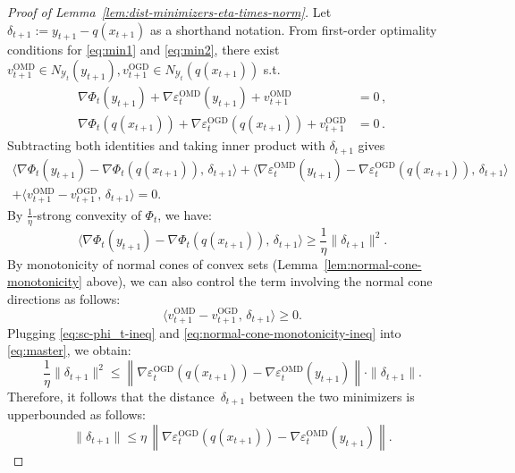 \documentclass[10pt,a4paper]{amsart}
\def\Y{{\mathcal Y}}
\begin{document}
\begin{proof}[Proof of Lemma~\ref{lem:dist-minimizers-eta-times-norm}]
Let $\delta_{t+1}:=y_{t+1}-q(x_{t+1})$ as a shorthand notation.  
From first-order optimality conditions for \eqref{eq:min1} and \eqref{eq:min2},
there exist $v_{t+1}^{\mathrm{OMD}} \in N_{\Y_t}(y_{t+1}), v_{t+1}^{\mathrm{OGD}} \in N_{\Y_t}(q(x_{t+1}))$ s.t. 
\begin{align*}
\nabla \Phi_t(y_{t+1})+\nabla \varepsilon_t^{\mathrm{OMD}}(y_{t+1})+v_{t+1}^{\mathrm{OMD}} &= 0\,,\\
\nabla \Phi_t(q(x_{t+1}))+\nabla \varepsilon_t^{\mathrm{OGD}}(q(x_{t+1}))+v_{t+1}^{\mathrm{OGD}} &= 0\,.
\end{align*}
Subtracting both identities and taking inner product with $\delta_{t+1}$ gives
\begin{multline}
\big\langle \nabla\Phi_t(y_{t+1})-\nabla\Phi_t(q(x_{t+1})),\,\delta_{t+1}\big\rangle
+ \big\langle \nabla\varepsilon_t^{\mathrm{OMD}}(y_{t+1})
- \nabla\varepsilon_t^{\mathrm{OGD}}(q(x_{t+1})),\,\delta_{t+1}\big\rangle \\
+ \big\langle v_{t+1}^{\mathrm{OMD}}-v_{t+1}^{\mathrm{OGD}}, \,\delta_{t+1} \big\rangle
=0.
\label{eq:master}
\end{multline}
By $\frac{1}{\eta}$-strong convexity of $\Phi_t$, we have: 
\begin{equation}
\label{eq:sc-phi_t-ineq}
\big\langle \nabla\Phi_t(y_{t+1})-\nabla\Phi_t(q(x_{t+1})), \,\delta_{t+1}\big\rangle
\ge \frac1\eta \|\delta_{t+1}\|^2.
\end{equation}
By monotonicity of normal cones of convex sets (Lemma~\ref{lem:normal-cone-monotonicity} above),
we can also control the term involving the normal cone directions as follows: 
\begin{equation}
\label{eq:normal-cone-monotonicity-ineq}
\big\langle v_{t+1}^{\mathrm{OMD}}-v_{t+1}^{\mathrm{OGD}}, \,\delta_{t+1} \big\rangle \ge 0.
\end{equation}
Plugging \eqref{eq:sc-phi_t-ineq} and \eqref{eq:normal-cone-monotonicity-ineq} into \eqref{eq:master}, we obtain: 
\begin{equation*}
\frac1\eta\|\delta_{t+1}\|^2
\le 
\left\| \nabla\varepsilon_t^{\mathrm{OGD}}(q(x_{t+1})) - \nabla\varepsilon_t^{\mathrm{OMD}}(y_{t+1}) \right\|
\cdot \|\delta_{t+1}\|.
\end{equation*}
Therefore, it follows that the distance~$\delta_{t+1}$ between the two minimizers is upperbounded as follows: 
\[
\|\delta_{t+1}\|
\le
\eta\,
\left\|
\nabla\varepsilon_t^{\mathrm{OGD}}(q(x_{t+1}))
-
\nabla\varepsilon_t^{\mathrm{OMD}}(y_{t+1})
\right\|.
\]
\end{proof}
\end{document}

